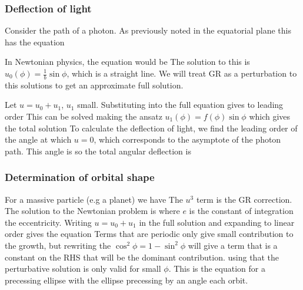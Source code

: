 \documentclass{article}
\begin{document}
\subsubsection{Deflection of light}
Consider the path of a photon. As previously noted in the equatorial plane this has the equation 
\begin{idea}
In Newtonian physics, the equation would be 
The solution to this is $u_0(\phi) = \frac{1}{b}\sin\phi$, which is a straight line. We will treat GR as a perturbation to this solutions to get an approximate full solution. 
\end{idea}
Let $u = u_0 + u_1$, $u_1$ small. Substituting into the full equation gives to leading order
This can be solved making the ansatz $u_1(\phi) = f(\phi) \sin\phi$
which gives the total solution 
To calculate the deflection of light, we find the leading order of the angle at which $u=0$, which corresponds to the asymptote of the photon path. This angle is 
so the total angular deflection is 
\subsubsection{Determination of orbital shape}
For a massive particle (e.g a planet) we have 
The $u^3$ term is the GR correction. The solution to the Newtonian problem is 
where $e$ is the constant of integration the eccentricity. Writing $u = u_0 + u_1$ in the full solution and expanding to linear order gives the equation 
Terms that are periodic only give small contribution to the growth, but rewriting the $\cos^2\phi = 1 - \sin^2\phi$ will give a term that is a constant on the RHS that will be the dominant contribution. 
using that the perturbative solution is only valid for small $\phi$. This is the equation for a precessing ellipse with the ellipse precessing by an angle 
each orbit.
\end{document}
